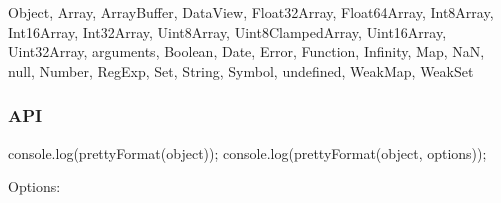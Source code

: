 {\ttfamily Object}, {\ttfamily Array}, {\ttfamily Array\+Buffer}, {\ttfamily Data\+View}, {\ttfamily Float32\+Array}, {\ttfamily Float64\+Array}, {\ttfamily Int8\+Array}, {\ttfamily Int16\+Array}, {\ttfamily Int32\+Array}, {\ttfamily Uint8\+Array}, {\ttfamily Uint8\+Clamped\+Array}, {\ttfamily Uint16\+Array}, {\ttfamily Uint32\+Array}, {\ttfamily arguments}, {\ttfamily Boolean}, {\ttfamily Date}, {\ttfamily Error}, {\ttfamily Function}, {\ttfamily Infinity}, {\ttfamily Map}, {\ttfamily NaN}, {\ttfamily null}, {\ttfamily Number}, {\ttfamily Reg\+Exp}, {\ttfamily Set}, {\ttfamily String}, {\ttfamily Symbol}, {\ttfamily undefined}, {\ttfamily Weak\+Map}, {\ttfamily Weak\+Set}

\subsubsection*{A\+PI}


\begin{DoxyCode}
console.log(prettyFormat(object));
console.log(prettyFormat(object, options));
\end{DoxyCode}


Options\+:


